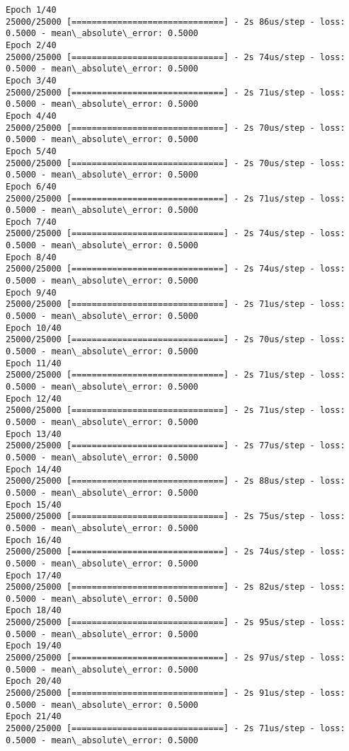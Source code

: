 \documentclass[11pt]{article}
\begin{document}
    \begin{Verbatim}[commandchars=\\\{\}]
Epoch 1/40
25000/25000 [==============================] - 2s 86us/step - loss: 0.5000 - mean\_absolute\_error: 0.5000
Epoch 2/40
25000/25000 [==============================] - 2s 74us/step - loss: 0.5000 - mean\_absolute\_error: 0.5000
Epoch 3/40
25000/25000 [==============================] - 2s 71us/step - loss: 0.5000 - mean\_absolute\_error: 0.5000
Epoch 4/40
25000/25000 [==============================] - 2s 70us/step - loss: 0.5000 - mean\_absolute\_error: 0.5000
Epoch 5/40
25000/25000 [==============================] - 2s 70us/step - loss: 0.5000 - mean\_absolute\_error: 0.5000
Epoch 6/40
25000/25000 [==============================] - 2s 71us/step - loss: 0.5000 - mean\_absolute\_error: 0.5000
Epoch 7/40
25000/25000 [==============================] - 2s 74us/step - loss: 0.5000 - mean\_absolute\_error: 0.5000
Epoch 8/40
25000/25000 [==============================] - 2s 74us/step - loss: 0.5000 - mean\_absolute\_error: 0.5000
Epoch 9/40
25000/25000 [==============================] - 2s 71us/step - loss: 0.5000 - mean\_absolute\_error: 0.5000
Epoch 10/40
25000/25000 [==============================] - 2s 70us/step - loss: 0.5000 - mean\_absolute\_error: 0.5000
Epoch 11/40
25000/25000 [==============================] - 2s 71us/step - loss: 0.5000 - mean\_absolute\_error: 0.5000
Epoch 12/40
25000/25000 [==============================] - 2s 71us/step - loss: 0.5000 - mean\_absolute\_error: 0.5000
Epoch 13/40
25000/25000 [==============================] - 2s 77us/step - loss: 0.5000 - mean\_absolute\_error: 0.5000
Epoch 14/40
25000/25000 [==============================] - 2s 88us/step - loss: 0.5000 - mean\_absolute\_error: 0.5000
Epoch 15/40
25000/25000 [==============================] - 2s 75us/step - loss: 0.5000 - mean\_absolute\_error: 0.5000
Epoch 16/40
25000/25000 [==============================] - 2s 74us/step - loss: 0.5000 - mean\_absolute\_error: 0.5000
Epoch 17/40
25000/25000 [==============================] - 2s 82us/step - loss: 0.5000 - mean\_absolute\_error: 0.5000
Epoch 18/40
25000/25000 [==============================] - 2s 95us/step - loss: 0.5000 - mean\_absolute\_error: 0.5000
Epoch 19/40
25000/25000 [==============================] - 2s 97us/step - loss: 0.5000 - mean\_absolute\_error: 0.5000
Epoch 20/40
25000/25000 [==============================] - 2s 91us/step - loss: 0.5000 - mean\_absolute\_error: 0.5000
Epoch 21/40
25000/25000 [==============================] - 2s 71us/step - loss: 0.5000 - mean\_absolute\_error: 0.5000

\end{Verbatim}
\end{document}

